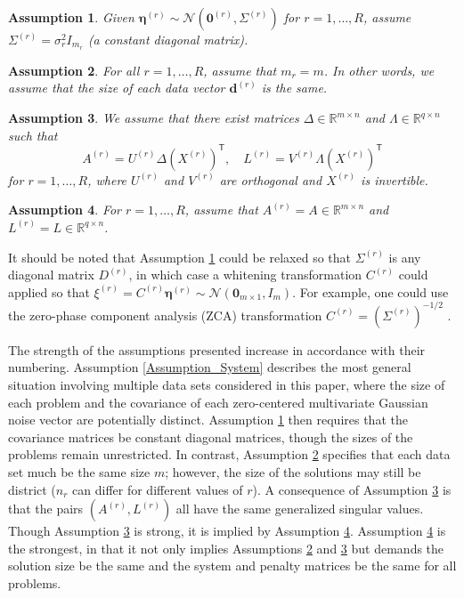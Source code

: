 \documentclass[12pt]{article}
\newcommand{\mA}{m}	%
\newcommand{\mL}{q}	%
\newcommand{\dVec}{\mathbf{d}}	%
\newcommand{\trans}[1]{{#1}^\mathsf{T}}	%
\newcommand{\noise}{\eta}	%
\newcommand{\noiseSD}{\sigma}	%
\newcommand{\noiseVec}{\bm{\noise}}	%
\newcommand{\zeroVec}{\bm{0}}	%
\newtheorem{assumption}{Assumption}
\begin{document}
\begin{assumption}
\label{Assumption_Noise}
Given $\noiseVec^{(r)} \sim \mathcal{N}(\zeroVec^{(r)},\Sigma^{(r)})$ for $r = 1,\ldots,R$, assume $\Sigma^{(r)} = \noiseSD_r^2 I_{m_r}$ (a constant diagonal matrix).
\end{assumption}

\begin{assumption}
\label{Assumption_Rows}
For all $r = 1,\ldots,R$, assume that $m_r = m$. In other words, we assume that the size of each data vector $\dVec^{(r)}$ is the same.
\end{assumption} 

\begin{assumption}
\label{Assumption_Decomposition}
We assume that there exist matrices $\Delta \in \mathbb{R}^{\mA \times n}$ and $\Lambda \in \mathbb{R}^{\mL \times n}$ such that
\[A^{(r)} = U^{(r)}\Delta\trans{\left(X^{(r)}\right)}, \quad L^{(r)} = V^{(r)}\Lambda\trans{\left(X^{(r)}\right)}\]
for $r = 1,\ldots,R$, where $U^{(r)}$ and $V^{(r)}$ are orthogonal and $X^{(r)}$ is invertible.
\end{assumption}

\begin{assumption}
\label{Assumption_Matrices}
For $r = 1,\ldots,R$, assume that $A^{(r)} = A \in \mathbb{R}^{\mA \times n}$ and $L^{(r)} = L \in \mathbb{R}^{\mL \times n}$.
\end{assumption}  

\noindent It should be noted that Assumption \ref{Assumption_Noise} could be relaxed so that $\Sigma^{(r)}$ is any diagonal matrix $D^{(r)}$, in which case a whitening transformation $C^{(r)}$ could applied so that $\xi^{(r)} = C^{(r)}\noiseVec^{(r)} \sim \mathcal{N}(\zeroVec_{\mA \times 1},I_{\mA})$. For example, one could use the zero-phase component analysis (ZCA) transformation $C^{(r)} = \left(\Sigma^{(r)}\right)^{-1/2}$ \cite{BellSejnowski}. \par
The strength of the assumptions presented increase in accordance with their numbering. Assumption \ref{Assumption_System} describes the most general situation involving multiple data sets considered in this paper, where the size of each problem and the covariance of each zero-centered multivariate Gaussian noise vector are potentially distinct. Assumption \ref{Assumption_Noise} then requires that the covariance matrices be constant diagonal matrices, though the sizes of the problems remain unrestricted. In contrast, Assumption \ref{Assumption_Rows} specifies that each data set much be the same size $m$; however, the size of the solutions may still be district ($n_r$ can differ for different values of $r$). A consequence of Assumption \ref{Assumption_Decomposition} is that the pairs $(A^{(r)},L^{(r)})$ all have the same generalized singular values. Though Assumption \ref{Assumption_Decomposition} is strong, it is implied by Assumption \ref{Assumption_Matrices}. Assumption \ref{Assumption_Matrices} is the strongest, in that it not only implies Assumptions \ref{Assumption_Rows} and \ref{Assumption_Decomposition} but demands the solution size be the same and the system and penalty matrices be the same for all problems. 
\end{document}
